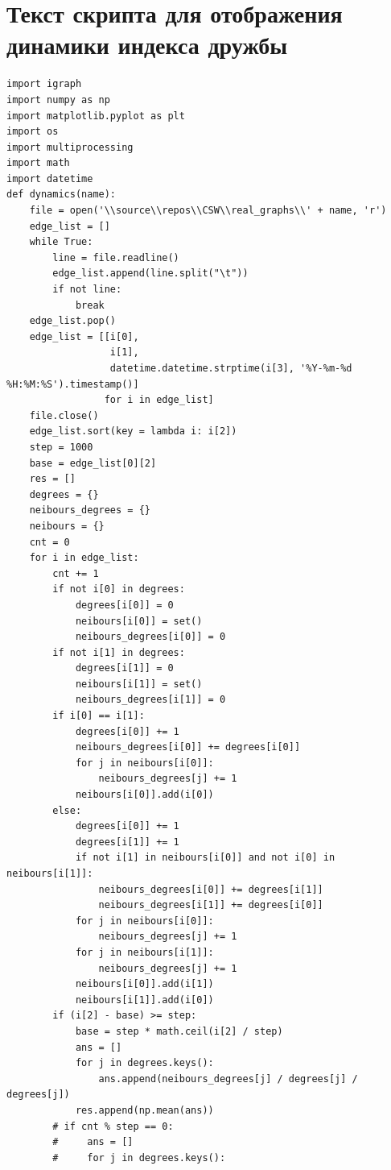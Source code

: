 \documentclass[bachelor, och, diploma]{SCWorks}
\begin{document}
\section{Текст скрипта для отображения динамики индекса дружбы}\label{app:rg}
\begin{verbatim}
import igraph
import numpy as np
import matplotlib.pyplot as plt
import os
import multiprocessing 
import math
import datetime
def dynamics(name):
    file = open('\\source\\repos\\CSW\\real_graphs\\' + name, 'r')
    edge_list = []
    while True:
        line = file.readline()
        edge_list.append(line.split("\t"))
        if not line:
            break
    edge_list.pop()
    edge_list = [[i[0], 
                  i[1], 
                  datetime.datetime.strptime(i[3], '%Y-%m-%d %H:%M:%S').timestamp()] 
                 for i in edge_list]
    file.close()
    edge_list.sort(key = lambda i: i[2])
    step = 1000
    base = edge_list[0][2]
    res = []
    degrees = {}
    neibours_degrees = {}
    neibours = {}
    cnt = 0
    for i in edge_list:
        cnt += 1
        if not i[0] in degrees:
            degrees[i[0]] = 0
            neibours[i[0]] = set()
            neibours_degrees[i[0]] = 0
        if not i[1] in degrees:
            degrees[i[1]] = 0
            neibours[i[1]] = set()
            neibours_degrees[i[1]] = 0
        if i[0] == i[1]:
            degrees[i[0]] += 1
            neibours_degrees[i[0]] += degrees[i[0]]
            for j in neibours[i[0]]:
                neibours_degrees[j] += 1
            neibours[i[0]].add(i[0])
        else:
            degrees[i[0]] += 1
            degrees[i[1]] += 1
            if not i[1] in neibours[i[0]] and not i[0] in neibours[i[1]]:
                neibours_degrees[i[0]] += degrees[i[1]]
                neibours_degrees[i[1]] += degrees[i[0]]
            for j in neibours[i[0]]:
                neibours_degrees[j] += 1
            for j in neibours[i[1]]:
                neibours_degrees[j] += 1
            neibours[i[0]].add(i[1])
            neibours[i[1]].add(i[0])
        if (i[2] - base) >= step:
            base = step * math.ceil(i[2] / step)
            ans = []
            for j in degrees.keys():
                ans.append(neibours_degrees[j] / degrees[j] / degrees[j])
            res.append(np.mean(ans))
        # if cnt % step == 0:
        #     ans = []
        #     for j in degrees.keys():

\end{verbatim}
\end{document}
